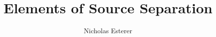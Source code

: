 \documentclass[letterpaper,12pt]{report}
\begin{document}
\author{Nicholas Esterer}
\title{Elements of Source Separation}
\maketitle
\tableofcontents















\end{document}
